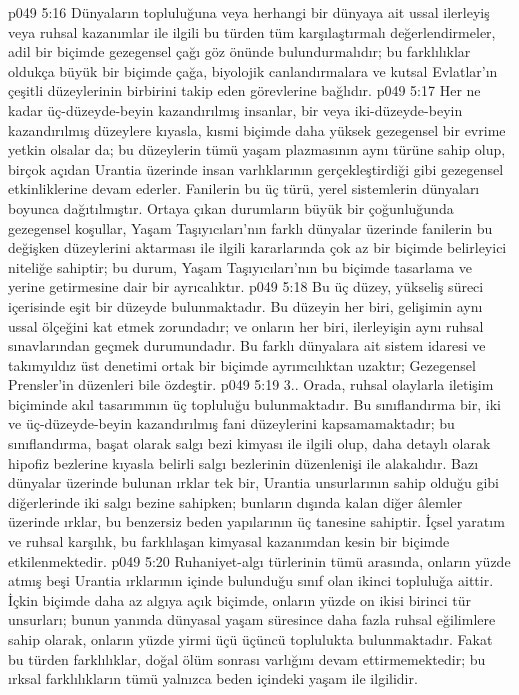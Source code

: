 \vs p049 5:16 Dünyaların topluluğuna veya herhangi bir dünyaya ait ussal ilerleyiş veya ruhsal kazanımlar ile ilgili bu türden tüm karşılaştırmalı değerlendirmeler, adil bir biçimde gezegensel çağı göz önünde bulundurmalıdır; bu farklılıklar oldukça büyük bir biçimde çağa, biyolojik canlandırmalara ve kutsal Evlatlar’ın çeşitli düzeylerinin birbirini takip eden görevlerine bağlıdır.
\vs p049 5:17 Her ne kadar üç\hyp{}düzeyde\hyp{}beyin kazandırılmış insanlar, bir veya iki\hyp{}düzeyde\hyp{}beyin kazandırılmış düzeylere kıyasla, kısmi biçimde daha yüksek gezegensel bir evrime yetkin olsalar da; bu düzeylerin tümü yaşam plazmasının aynı türüne sahip olup, birçok açıdan Urantia üzerinde insan varlıklarının gerçekleştirdiği gibi gezegensel etkinliklerine devam ederler. Fanilerin bu üç türü, yerel sistemlerin dünyaları boyunca dağıtılmıştır. Ortaya çıkan durumların büyük bir çoğunluğunda gezegensel koşullar, Yaşam Taşıyıcıları’nın farklı dünyalar üzerinde fanilerin bu değişken düzeylerini aktarması ile ilgili kararlarında çok az bir biçimde belirleyici niteliğe sahiptir; bu durum, Yaşam Taşıyıcıları’nın bu biçimde tasarlama ve yerine getirmesine dair bir ayrıcalıktır.
\vs p049 5:18 Bu üç düzey, yükseliş süreci içerisinde eşit bir düzeyde bulunmaktadır. Bu düzeyin her biri, gelişimin aynı ussal ölçeğini kat etmek zorundadır; ve onların her biri, ilerleyişin aynı ruhsal sınavlarından geçmek durumundadır. Bu farklı dünyalara ait sistem idaresi ve takımyıldız üst denetimi ortak bir biçimde ayrımcılıktan uzaktır; Gezegensel Prensler’in düzenleri bile özdeştir.
\vs p049 5:19 3.\bibnobreakspace {}. Orada, ruhsal olaylarla iletişim biçiminde akıl tasarımının üç topluluğu bulunmaktadır. Bu sınıflandırma bir, iki ve üç\hyp{}düzeyde\hyp{}beyin kazandırılmış fani düzeylerini kapsamamaktadır; bu sınıflandırma, başat olarak salgı bezi kimyası ile ilgili olup, daha detaylı olarak hipofiz bezlerine kıyasla belirli salgı bezlerinin düzenlenişi ile alakalıdır. Bazı dünyalar üzerinde bulunan ırklar tek bir, Urantia unsurlarının sahip olduğu gibi diğerlerinde iki salgı bezine sahipken; bunların dışında kalan diğer âlemler üzerinde ırklar, bu benzersiz beden yapılarının üç tanesine sahiptir. İçsel yaratım ve ruhsal karşılık, bu farklılaşan kimyasal kazanımdan kesin bir biçimde etkilenmektedir.
\vs p049 5:20 Ruhaniyet\hyp{}algı türlerinin tümü arasında, onların yüzde atmış beşi Urantia ırklarının içinde bulunduğu sınıf olan ikinci topluluğa aittir. İçkin biçimde daha az algıya açık biçimde, onların yüzde on ikisi birinci tür unsurları; bunun yanında dünyasal yaşam süresince daha fazla ruhsal eğilimlere sahip olarak, onların yüzde yirmi üçü üçüncü toplulukta bulunmaktadır. Fakat bu türden farklılıklar, doğal ölüm sonrası varlığını devam ettirmemektedir; bu ırksal farklılıkların tümü yalnızca beden içindeki yaşam ile ilgilidir.
